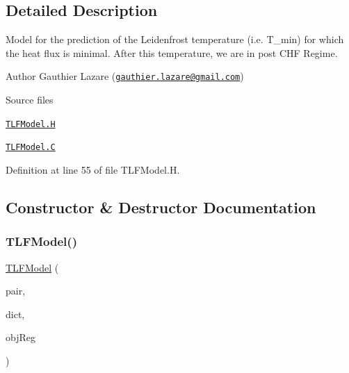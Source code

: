 \subsection{Detailed Description}
Model for the prediction of the Leidenfrost temperature (i.\+e. T\+\_\+min) for which the heat flux is minimal. After this temperature, we are in post C\+HF Regime. 

\label{_Description}%
 Author Gauthier Lazare (\href{mailto:gauthier.lazare@gmail.com}{\tt gauthier.\+lazare@gmail.\+com})

\begin{DoxyParagraph}{Source files}

\begin{DoxyItemize}
\item \href{../../../home/carlo/data/GeN-Foam/GeN-Foam_ffn/GeN-Foam/GeN-Foam/classes/thermalHydraulics/src/physicsModels/heatTransferModels/FSHeatTransferCoefficientModels/subModels/CHFModels/LeidenFrostTemperatureModels/TLFModel.H}{\tt T\+L\+F\+Model.\+H} 
\item \href{../../../home/carlo/data/GeN-Foam/GeN-Foam_ffn/GeN-Foam/GeN-Foam/classes/thermalHydraulics/src/physicsModels/heatTransferModels/FSHeatTransferCoefficientModels/subModels/CHFModels/LeidenFrostTemperatureModels/TLFModel.C}{\tt T\+L\+F\+Model.\+C} 
\end{DoxyItemize}
\end{DoxyParagraph}


Definition at line 55 of file T\+L\+F\+Model.\+H.



\subsection{Constructor \& Destructor Documentation}
\mbox{\label{classFoam_1_1TLFModel_a7b21d2cae1fe02e7c13782ec3e7bf85f}} 
\subsubsection{\texorpdfstring{T\+L\+F\+Model()}{TLFModel()}}
{\footnotesize\ttfamily \hyperlink{classFoam_1_1TLFModel}{T\+L\+F\+Model} (\begin{DoxyParamCaption}\item[{const \hyperlink{classFoam_1_1FSPair}{F\+S\+Pair} \&}]{pair,  }\item[{const dictionary \&}]{dict,  }\item[{const object\+Registry \&}]{obj\+Reg }\end{DoxyParamCaption})}



